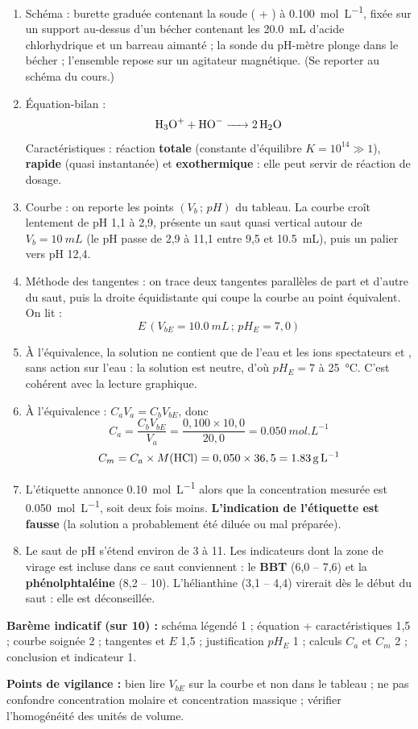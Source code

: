 \documentclass[11pt]{article}
\begin{document}
\begin{corrige}
\begin{enumerate}
\item Schéma : burette graduée contenant la soude ( + ) à \SI{0,100}{mol.L^{-1}}, fixée sur un support au-dessus d'un bécher contenant les \SI{20,0}{mL} d'acide chlorhydrique et un barreau aimanté ; la sonde du pH-mètre plonge dans le bécher ; l'ensemble repose sur un agitateur magnétique. (Se reporter au schéma du cours.)
\item Équation-bilan :
\[ \ce{H3O+ + HO- -> 2 H2O} \]
Caractéristiques : réaction \textbf{totale} (constante d'équilibre $K = 10^{14} \gg 1$), \textbf{rapide} (quasi instantanée) et \textbf{exothermique} : elle peut servir de réaction de dosage.
\item Courbe : on reporte les points $(V_b\,;\,pH)$ du tableau. La courbe croît lentement de pH 1,1 à 2,9, présente un saut quasi vertical autour de $V_b = \SI{10}{mL}$ (le pH passe de 2,9 à 11,1 entre 9,5 et \SI{10,5}{mL}), puis un palier vers pH 12,4.
\item Méthode des tangentes : on trace deux tangentes parallèles de part et d'autre du saut, puis la droite équidistante qui coupe la courbe au point équivalent. On lit :
\[ E\,(V_{bE} = \SI{10,0}{mL}\,;\, pH_E = 7,0) \]
\item À l'équivalence, la solution ne contient que de l'eau et les ions spectateurs  et , sans action sur l'eau : la solution est neutre, d'où $pH_E = 7$ à \SI{25}{\celsius}. C'est cohérent avec la lecture graphique.
\item À l'équivalence : $C_a V_a = C_b V_{bE}$, donc
\[ C_a = \frac{C_b V_{bE}}{V_a} = \frac{0,100 \times 10,0}{20,0} = \SI{0,050}{mol.L^{-1}} \]
\[ C_m = C_a \times M(\ce{HCl}) = 0,050 \times 36,5 = \SI{1,83}{g.L^{-1}} \]
\item L'étiquette annonce \SI{0,10}{mol.L^{-1}} alors que la concentration mesurée est \SI{0,050}{mol.L^{-1}}, soit deux fois moins. \textbf{L'indication de l'étiquette est fausse} (la solution a probablement été diluée ou mal préparée).
\item Le saut de pH s'étend environ de 3 à 11. Les indicateurs dont la zone de virage est incluse dans ce saut conviennent : le \textbf{BBT} (6,0 -- 7,6) et la \textbf{phénolphtaléine} (8,2 -- 10). L'hélianthine (3,1 -- 4,4) virerait dès le début du saut : elle est déconseillée.
\end{enumerate}
\textbf{Barème indicatif (sur 10) :} schéma légendé 1 ; équation + caractéristiques 1,5 ; courbe soignée 2 ; tangentes et $E$ 1,5 ; justification $pH_E$ 1 ; calculs $C_a$ et $C_m$ 2 ; conclusion et indicateur 1.

\textbf{Points de vigilance :} bien lire $V_{bE}$ sur la courbe et non dans le tableau ; ne pas confondre concentration molaire et concentration massique ; vérifier l'homogénéité des unités de volume.
\end{corrige}
\end{document}
